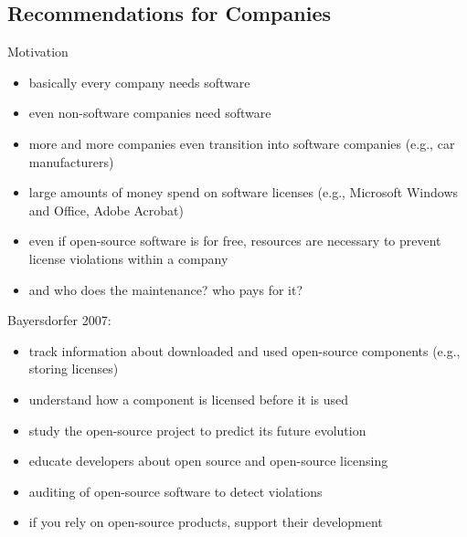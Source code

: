 \subsection{Recommendations for Companies}
\begin{frame}{\insertsubsection} %
	\begin{fancycolumns}
		\begin{note}{Motivation}
			\begin{itemize}
				\item basically every company needs software
				\item even non-software companies need software
				\item more and more companies even transition into software companies (e.g., car manufacturers)
				\item large amounts of money spend on software licenses (e.g., Microsoft Windows and Office, Adobe Acrobat)
				\item even if open-source software is for free, resources are necessary to prevent license violations within a company
				\item and who does the maintenance? who pays for it?
			\end{itemize}
		\end{note}
		\nextcolumn
		\begin{definition}{Bayersdorfer 2007: \mysource{\sommerville}}
			\begin{itemize}
				\item track information about downloaded and used open-source components (e.g., storing licenses)
				\item understand how a component is licensed before it is used
				\item study the open-source project to predict its future evolution
				\item educate developers about open source and open-source licensing \correct
				\item auditing of open-source software to detect violations
				\item if you rely on open-source products, support their development
			\end{itemize}
		\end{definition}
	\end{fancycolumns}
\end{frame}

